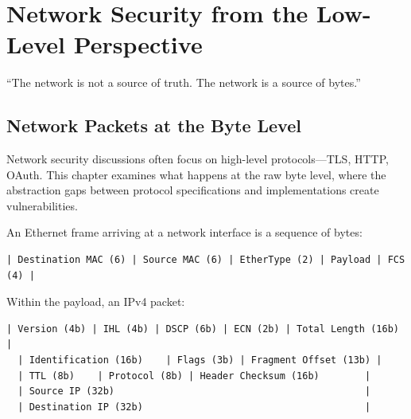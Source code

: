 \chapter{Network Security from the Low-Level Perspective}
\label{ch:network}

\epigraph{``The network is not a source of truth. The network is a source of bytes.''}{}


\section{Network Packets at the Byte Level}

Network security discussions often focus on high-level protocols---TLS, HTTP, OAuth. This chapter examines what happens at the raw byte level, where the abstraction gaps between protocol specifications and implementations create vulnerabilities.

An Ethernet frame arriving at a network interface is a sequence of bytes:

\begin{lstlisting}[caption=Ethernet frame (simplified)]
  | Destination MAC (6) | Source MAC (6) | EtherType (2) | Payload | FCS (4) |
\end{lstlisting}

Within the payload, an IPv4 packet:

\begin{lstlisting}[caption=IPv4 header (20 bytes)]
  | Version (4b) | IHL (4b) | DSCP (6b) | ECN (2b) | Total Length (16b) |
  | Identification (16b)    | Flags (3b) | Fragment Offset (13b) |
  | TTL (8b)    | Protocol (8b) | Header Checksum (16b)        |
  | Source IP (32b)                                            |
  | Destination IP (32b)                                       |
\end{lstlisting}

